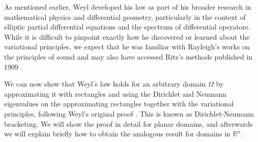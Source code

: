 \documentclass{amsart}
\theoremstyle{definition}
\newcommand*{\R}{\mathbb{R}}
\begin{document}
As mentioned earlier, Weyl developed his law as part of his broader research in mathematical physics and differential geometry, particularly in the context of elliptic partial differential equations and the spectrum of differential operators. While it is difficult to pinpoint exactly how he discovered or learned about the variational principles, we expect that he was familiar with Rayleigh's works on the principles of sound \cite{Rayleigh2011} and may also have accessed Ritz's methods published in 1909 \cite{Ritz1909}.  


We can now show that Weyl's law holds for an arbitrary domain $\Omega$ by approximating it with rectangles and using the Dirichlet and Neumann eigenvalues on the approximating rectangles together with the variational principles, following Weyl's original proof \cite{weyl1912asymptotische}. This is known as Dirichlet-Neumann bracketing. We will show the proof in detail for planar domains, and afterwards we will explain briefly how to obtain the analogous result for domains in $\R^n$.
\end{document}
